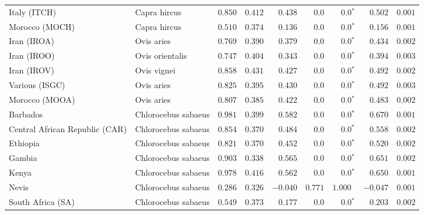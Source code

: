 \begin{center}
\begin{adjustbox}{width = 1\textwidth}
\begin{tabular}{|l|l|r|r|r|r|r|r|r|}
            Italy (ITCH)                    & Capra hircus          & $ 0.850$ & $ 0.412$ & $ 0.438$ & $0.0$    & $\bm{0.0{^*}}$    & $ 0.502$ & $ 0.001$  \\
            Morocco (MOCH)                    & Capra hircus     & $ 0.510$ & $ 0.374$ & $ 0.136$ & $0.0$    & $\bm{0.0{^*}}$    & $ 0.156$ & $ 0.001$ \\
            Iran (IROA)                    & Ovis aries         & $ 0.769$ & $ 0.390$ & $ 0.379$ & $0.0$    & $\bm{0.0{^*}}$    & $ 0.434$ & $ 0.002$ \\
            Iran (IROO)                 & Ovis orientalis          & $ 0.747$ & $ 0.404$ & $ 0.343$ & $0.0$    & $\bm{0.0{^*}}$    & $ 0.394$ & $ 0.003$ \\
            Iran (IROV)                 & Ovis vignei          & $ 0.858$ & $ 0.431$ & $ 0.427$ & $0.0$    & $\bm{0.0{^*}}$    & $ 0.492$ & $ 0.002$ \\
            Various (ISGC)                       & Ovis aries & $ 0.825$ & $ 0.395$ & $ 0.430$ & $0.0$    & $\bm{0.0{^*}}$    & $ 0.492$ & $ 0.003$ \\
            Morocco (MOOA) & Ovis aries & $ 0.807$ & $ 0.385$ & $ 0.422$ & $0.0$ & $\bm{0.0{^*}}$ & $ 0.483$ & $ 0.002$ \\
            Barbados                       & Chlorocebus sabaeus & $ 0.981$ & $ 0.399$ & $ 0.582$ & $0.0$    & $\bm{0.0{^*}}$    & $ 0.670$ & $ 0.001$ \\
            Central African Republic (CAR)                         & Chlorocebus sabaeus & $ 0.854$ & $ 0.370$ & $ 0.484$ & $0.0$    & $\bm{0.0{^*}}$    & $ 0.558$ & $ 0.002$ \\
            Ethiopia                          & Chlorocebus sabaeus & $ 0.821$ & $ 0.370$ & $ 0.452$ & $0.0$    & $\bm{0.0{^*}}$    & $ 0.520$ & $ 0.002$ \\
            Gambia                          & Chlorocebus sabaeus & $ 0.903$ & $ 0.338$ & $ 0.565$ & $0.0$ & $\bm{0.0{^*}}$        & $ 0.651$ & $ 0.002$ \\
            Kenya              & Chlorocebus sabaeus & $ 0.978$ & $ 0.416$ & $ 0.562$ & $0.0$    & $\bm{0.0{^*}}$ & $ 0.650$ & $ 0.001$ \\
            Nevis               & Chlorocebus sabaeus & $ 0.286$ & $ 0.326$ & $-0.040$ & $ 0.771$    & $ 1.000~~$ & $-0.047$ & $ 0.001$ \\
            South Africa (SA)                         & Chlorocebus sabaeus & $ 0.549$ & $ 0.373$ & $ 0.177$ & $0.0$    & $\bm{0.0{^*}}$    & $ 0.203$ & $ 0.002$ \\

\end{tabular}
\end{adjustbox}
\end{center}

